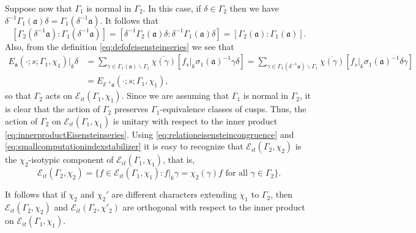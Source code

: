 \documentclass{article}
\theoremstyle{named}
\newcommand{\E}{\mathcal{E}}
\renewcommand{\a}{\mathfrak{a}}
\begin{document}
Suppose now that $\Gamma_1$ is normal in $\Gamma_2$. In this case, if $\delta \in \Gamma_2$ then we have $\delta^{-1}\Gamma_1(\a)\delta = \Gamma_1(\delta^{-1}\a)$. It follows that 
\begin{equation}\label{eq:smallcomputationindexstabilizer}
[\Gamma_2(\delta^{-1}\a): \Gamma_1(\delta^{-1}\a)] = [\delta^{-1}\Gamma_2(\a)\delta: \delta^{-1}\Gamma_1(\a)\delta] = [\Gamma_2(\a): \Gamma_1(\a)].
\end{equation}
Also, from the definition \eqref{eq:defofeisensteinseries} we see that 
\begin{equation*}
\begin{aligned}
    E_\a(\cdot; s; \Gamma_1, \chi_1)|_k \delta & = \sum_{\gamma \in \Gamma_1(\a) \backslash \Gamma_1} \overline{\chi(\gamma)}[f_s |_k \sigma_1(\a)^{-1}\gamma \delta] = \sum_{\gamma \in \Gamma_1(\delta^{-1}\a)\backslash \Gamma_1}\overline{\chi(\gamma)}[f_s|_k \sigma_1(\a)^{-1}\delta \gamma]\\
    & = E_{\delta^{-1}\a}(\cdot; s; \Gamma_1, \chi_1),
\end{aligned}
\end{equation*}
so that $\Gamma_2$ acts on $\E_{it}(\Gamma_1, \chi_1)$. Since we are assuming that $\Gamma_1$ is normal in $\Gamma_2$, it is clear that the action of $\Gamma_2$ preserves $\Gamma_1$-equivalence classes of cusps. Thus, the action of $\Gamma_2$ on $\E_{it}(\Gamma_1, \chi_1)$ is unitary with respect to the inner product \eqref{eq:innerproductEisensteinseries}. Using \eqref{eq:relationeisensteincongruence} and \eqref{eq:smallcomputationindexstabilizer} it is easy to recognize that $\E_{it}(\Gamma_2, \chi_2)$ is the $\chi_2$-isotypic component of $\E_{it}(\Gamma_1, \chi_1)$, that is,
\begin{equation*}
    \E_{it}(\Gamma_2, \chi_2) = \{f \in \E_{it}(\Gamma_1, \chi_1) : f|_k \gamma = \chi_2(\gamma)f \text{ for all }\gamma \in \Gamma_2\}.
\end{equation*}



It follows that if $\chi_2$ and $\chi_2'$ are different characters extending $\chi_1$ to $\Gamma_2$, then $\E_{it}(\Gamma_2, \chi_2)$ and $\E_{it}(\Gamma_2, \chi'_2)$ are orthogonal with respect to the inner product on $\E_{it}(\Gamma_1, \chi_1)$.
\end{document}
